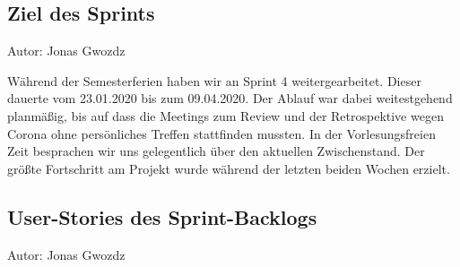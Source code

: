 \subsection{Ziel des Sprints}
{\small Autor: Jonas Gwozdz}

Während der Semesterferien haben wir an Sprint 4 weitergearbeitet. Dieser dauerte vom 23.01.2020 bis zum  09.04.2020. Der Ablauf war dabei weitestgehend planmäßig, bis auf dass die Meetings zum Review und der Retrospektive wegen Corona ohne persönliches Treffen stattfinden mussten.
In der Vorlesungsfreien Zeit besprachen wir uns gelegentlich über den aktuellen Zwischenstand. Der größte Fortschritt am Projekt wurde während der letzten beiden Wochen erzielt.

\subsection{User-Stories des Sprint-Backlogs}
{\small Autor: Jonas Gwozdz}

